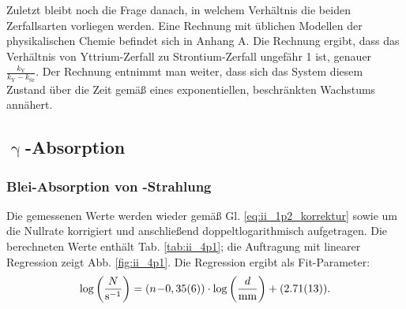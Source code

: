 




Zuletzt bleibt noch die Frage danach, in welchem Verhältnis die beiden Zerfallsarten vorliegen werden. Eine Rechnung mit üblichen Modellen der physikalischen Chemie befindet sich in Anhang A.
Die Rechnung ergibt, dass das Verhältnis von Yttrium-Zerfall zu Strontium-Zerfall ungefähr 1 ist, genauer $\frac{k_\mathrm{Y}}{k_\mathrm{Y} - k_\mathrm{Sr}}$. Der Rechnung entnimmt man weiter, dass sich das System diesem Zustand über die Zeit gemäß eines exponentiellen, beschränkten Wachstums annähert.

\FloatBarrier
\subsection{\texorpdfstring{$\upgamma$}{Gamma}-Absorption}
\subsubsection{Blei-Absorption von \texorpdfstring{}{Co60}-Strahlung}
Die gemessenen Werte werden wieder gemäß Gl. \eqref{eq:ii_1p2_korrektur} sowie um die Nullrate korrigiert und anschließend doppeltlogarithmisch aufgetragen. Die berechneten Werte enthält Tab. \ref{tab:ii_4p1}; die Auftragung mit linearer Regression zeigt Abb. \ref{fig:ii_4p1}. Die Regression ergibt als Fit-Parameter:
\begin{equation}
\log\left(\frac{N}{\si{\per\second}}\right) = (\numb{-0,35(6)}) \cdot \log\left(\frac{d}{\si{mm}}\right) + (\num{2,71(13)}).
\end{equation}

